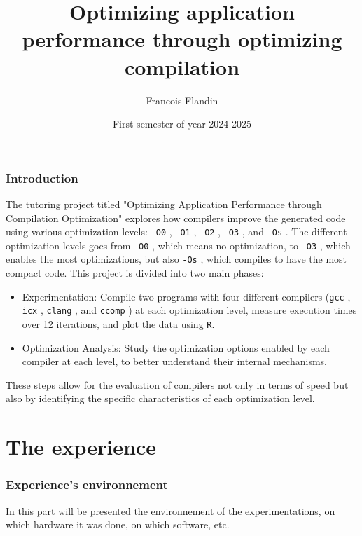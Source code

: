 \documentclass{rapport}
\title{Optimizing application performance through optimizing compilation}
\author{Francois Flandin}
\date{First semester of year 2024-2025}
\newcommand{\gcc}{\texttt{gcc} }
\newcommand{\icx}{\texttt{icx} }
\newcommand{\clang}{\texttt{clang} }
\newcommand{\comp}{\texttt{ccomp} }
\newcommand{\optizero}{\texttt{-O0} }
\newcommand{\optione}{\texttt{-O1} }
\newcommand{\optitwo}{\texttt{-O2} }
\newcommand{\optithree}{\texttt{-O3} }
\newcommand{\optisize}{\texttt{-Os} }
\begin{document}
\maketitle


\clearpage
\tableofcontents

\clearpage
\section{Introduction}
The tutoring project titled "Optimizing Application Performance through Compilation Optimization" explores how compilers improve the generated code 
using various optimization levels: \optizero, \optione, \optitwo, \optithree, and \optisize. \newline
The different optimization levels goes from \optizero, which means no optimization, to \optithree, which enables the most optimizations, but also \optisize, which
compiles to have the most compact code.\newline
This project is divided into two main phases:
\begin{itemize}
    \item Experimentation: Compile two programs with four different compilers (\gcc, \icx, \clang, and \comp) at each optimization level, 
    measure execution times over 12 iterations, and plot the data using \texttt{R}.
    \item Optimization Analysis: Study the optimization options enabled by each compiler at each level, to better understand their internal mechanisms.
\end{itemize}
These steps allow for the evaluation of compilers not only in terms of speed but also by identifying the specific characteristics of each optimization level.

\clearpage

\part{The experience}

\section*{Experience's environnement}
In this part will be presented the environnement of the experimentations, on which hardware it was done, on which software, etc.
\end{document}
